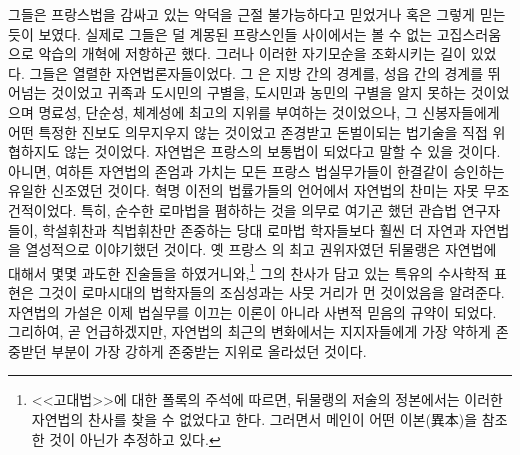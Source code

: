그들은 프랑스법을 감싸고 있는 악덕을 근절 불가능하다고 믿었거나
혹은 그렇게 믿는 듯이 보였다.
실제로 그들은 덜 계몽된 프랑스인들 사이에서는 볼 수 없는 고집스러움으로
악습의 개혁에 저항하곤 했다.
그러나 이러한 자기모순을 조화시키는 길이 있었다.
그들은 열렬한 자연법론자들이었다.
그 은 지방 간의 경계를, 성읍 간의 경계를 뛰어넘는 것이었고
귀족과 도시민의 구별을, 도시민과 농민의 구별을
알지 못하는 것이었으며
명료성, 단순성, 체계성에 최고의 지위를 부여하는 것이었으나,
그 신봉자들에게 어떤 특정한 진보도 의무지우지 않는 것이었고
존경받고 돈벌이되는 법기술을 직접 위협하지도 않는 것이었다.
자연법은 프랑스의 보통법이 되었다고 말할 수 있을 것이다.
아니면, 여하튼 자연법의 존엄과 가치는
모든 프랑스 법실무가들이 한결같이 승인하는 유일한 신조였던 것이다.
혁명 이전의 법률가들의 언어에서 자연법의 찬미는 자못 무조건적이었다.
특히,
순수한 로마법을 폄하하는 것을 의무로 여기곤 했던
관습법 연구자들이,
학설휘찬과 칙법휘찬만 존중하는 당대 로마법 학자들보다
훨씬 더 자연과 자연법을 열성적으로 이야기했던 것이다.
옛 프랑스 의 최고 권위자였던 뒤물랭은
자연법에 대해서 몇몇 과도한 진술들을 하였거니와,\footnote{%
  <<고대법>>에 대한 폴록의 주석에 따르면,
  뒤물랭의 저술의 정본에서는 이러한 자연법의 찬사를 찾을 수 없었다고 한다.
  그러면서 메인이 어떤 이본(異本)을 참조한 것이 아닌가 추정하고 있다.}
그의 찬사가 담고 있는 특유의 수사학적 표현은
그것이 로마시대의 법학자들의 조심성과는 사뭇 거리가 먼 것이었음을 알려준다.
자연법의 가설은 이제 법실무를 이끄는 이론이 아니라
사변적 믿음의 규약이 되었다.
그리하여, 곧 언급하겠지만, 자연법의 최근의 변화에서는
지지자들에게 가장 약하게 존중받던 부분이 가장 강하게 존중받는 지위로
올라섰던 것이다.

